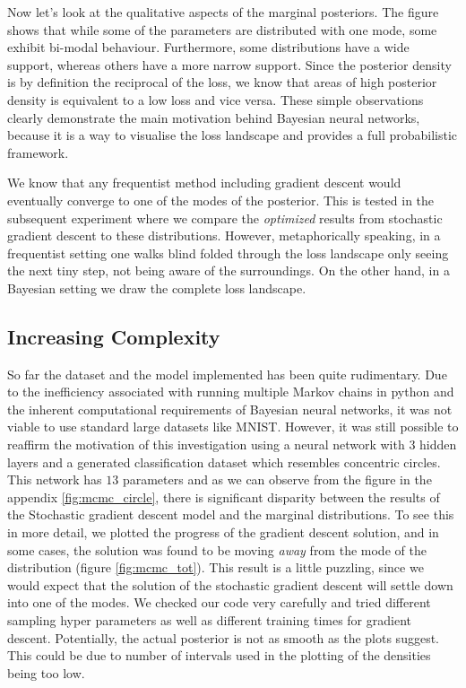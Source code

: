 \documentclass[review]{siamart190516}
\begin{document}
Now let's look at the qualitative aspects of the marginal posteriors. The figure shows that while some of the parameters are distributed with one mode, some exhibit bi-modal behaviour. Furthermore, some distributions have a wide support, whereas others have a more narrow support. Since the posterior density is by definition the reciprocal of the loss, we know that areas of high posterior density is equivalent to a low loss and vice versa.
These simple observations clearly demonstrate the main motivation behind Bayesian neural networks, because it is a way to visualise the loss landscape and provides a full probabilistic framework.

We know that any frequentist method including gradient descent would eventually converge to one of the modes of the posterior. This is tested in the subsequent experiment where we compare the \textit{optimized} results from stochastic gradient descent to these distributions. However, metaphorically speaking, in a frequentist setting one walks blind folded through the loss landscape only seeing the next tiny step, not being aware of the surroundings. On the other hand, in a Bayesian setting we draw the complete loss landscape.

\subsection{Increasing Complexity}
So far the dataset and the model implemented has been quite rudimentary. Due to the inefficiency associated with running multiple Markov chains in python and the inherent computational requirements of Bayesian neural networks, it was not viable to use standard large datasets like MNIST. However, it was still possible to reaffirm the motivation of this investigation using a neural network with $3$ hidden layers and a generated classification dataset which resembles concentric circles. This network has $13$ parameters and as we can observe from the figure in the appendix \ref{fig:mcmc_circle}, there is significant disparity between the results of the Stochastic gradient descent model and the marginal distributions. To see this in more detail, we plotted the progress of the gradient descent solution, and in some cases, the solution was found to be moving \textit{away} from the mode of the distribution (figure \ref{fig:mcmc_tot}). This result is a little puzzling, since we would expect that the solution of the stochastic gradient descent will settle down into one of the modes. We checked our code very carefully and tried different sampling hyper parameters as well as different training times for gradient descent. Potentially, the actual posterior is not as smooth as the plots suggest. This could be due to number of intervals used in the plotting of the densities being too low. 
\end{document}
